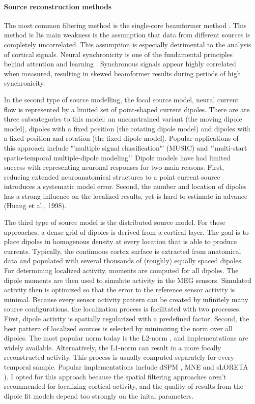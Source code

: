 \paragraph{Source reconstruction methods}
The most common filtering method is the single-core beamformer method \cite{1.5.Beamformer-a, 1.5.Beamformer-b}.
This method is 
Its main weakness is the assumption that data from different sources is completely uncorrelated.
This assumption is especially detrimental to the analysis of cortical signals.
Neural synchronicity is one of the fundamental principles behind attention and learning \cite{1.5.synchronicity}.
Synchronous signals appear highly correlated when measured, resulting in skewed beamformer results during periods of high synchronicity.

In the second type of source modelling, the focal source model, neural current flow is represented by a limited set of point-shaped current dipoles.
There are are three subcategories to this model: an unconstrained variant (the moving dipole model), dipoles with a fixed position (the rotating dipole model) and dipoles with a fixed position and rotation (the fixed dipole model).
Popular applications of this approach include "'multiple signal classification"' (MUSIC) \cite{1.5.music} and "'multi-start spatio-temporal multiple-dipole modeling"' \cite{1.5.simplex}
Dipole models have had limited success with representing neuronal responses for two main reasons.
First, reducing extended neuroanatomical structures to a point current source introduces a systematic model error.
Second, the number and location of dipoles has a strong influence on the localized results, yet is hard to estimate in advance (Huang et al., 1998).

The third type of source model is the distributed source model.
For these approaches, a dense grid of dipoles is derived from a cortical layer.
The goal is to place dipoles in homogenous density at every location that is able to produce currents.
Typically, the continuous cortex surface is extracted from anatomical data and populated with several thousands of (roughly) equally spaced dipoles.
For determining localized activity, moments are computed for all dipoles.
The dipole moments are then used to simulate activity in the MEG sensors.
Simulated activity then is optimized so that the error to the reference sensor activity is minimal.
Because every sensor activity pattern can be created by infinitely many source configurations, the localization process is facilitated with two processes.
First, dipole activity is spatially regularized with a predefined factor.
Second, the best pattern of localized sources is selected by minimizing the norm over all dipoles.
The most popular norm today is the L2-norm \cite{1.5.L2}, and implementations are widely available.
Alternatively, the L1-norm \cite{1.5.L1} can result in a more focally reconstructed activity.
This process is usually computed separately for every temporal sample.
Popular implementations include dSPM \cite{1.5.dSPM}, MNE \cite{1.5.MNE} and sLORETA \cite{1.5.sLORETA}).
I opted for this approach because the spatial filtering approaches aren't recommended for localizing cortical activity, and the quality of results from the dipole fit models depend too strongly on the inital parameters.

